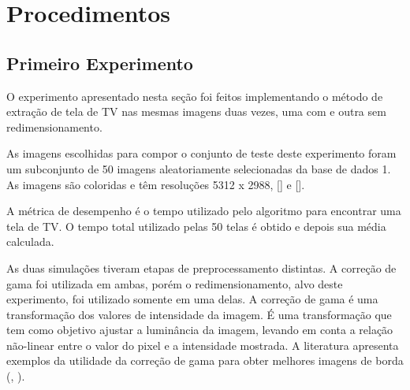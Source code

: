 \section{Procedimentos}

\subsection{Primeiro Experimento}


O experimento apresentado nesta seção foi feitos implementando o método de extração de tela de TV nas mesmas imagens duas vezes, uma com e outra sem redimensionamento.


As imagens escolhidas para compor o conjunto de teste deste experimento foram um subconjunto de 50 imagens aleatoriamente selecionadas da base de dados 1. As imagens são coloridas e têm resoluções 5312 x 2988, [] e [].


A métrica de desempenho é o tempo utilizado pelo algoritmo para encontrar uma tela de TV.
O tempo total utilizado pelas 50 telas é obtido e depois sua média calculada.


As duas simulações tiveram etapas de preprocessamento distintas. A correção de gama foi utilizada em ambas, porém o redimensionamento, alvo deste experimento, foi utilizado somente em uma delas.
A correção de gama é uma transformação dos valores de intensidade da imagem. É uma transformação que tem como objetivo ajustar a luminância da imagem, levando em conta a relação não-linear entre o valor do pixel e a intensidade mostrada. A literatura apresenta exemplos da utilidade da correção de gama para obter melhores imagens de borda (\cite{corrgamma00}, \cite{corrgamma01}).



